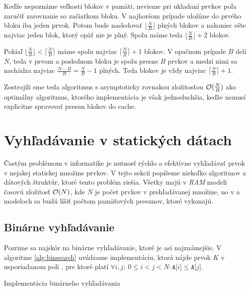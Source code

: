 Keďže nepoznáme veľkosti blokov v pamäti, nevieme pri ukladaní prvkov poľa zaručiť zarovnanie so začiatkom bloku. V najhoršom prípade uložíme do prvého bloku iba jeden prvok. Potom bude nasledovať $\lfloor \frac{N}{B} \rfloor$ plných blokov a nakoniec ešte najviac jeden blok, ktorý opäť nie je plný. Spolu máme teda $\lfloor \frac{N}{B} \rfloor + 2$ blokov.

Pokiaľ $\lfloor \frac{N}{B} \rfloor < \lceil \frac{N}{B} \rceil$ máme spolu najviac $\lceil \frac{N}{B} \rceil + 1$ blokov. V opačnom prípade $B$ delí $N$, teda v prvom a poslednom bloku je spolu presne $B$ prvkov a medzi nimi sa nachádza najviac $\frac{N-B}{B} = \frac{N}{B} - 1$ plných. Teda blokov je vždy najviac $\lceil \frac{N}{B} \rceil +1$.

Zostrojili sme teda \obliv algoritmus s asymptoticky rovnakou zložitosťou $\mathcal{O}(\frac{N}{B})$ ako optimálny \aware algoritmus, ktorého implementácia je však jednoduchšia, keďže nemusí explicitne spravovať presun blokov do cache.

\section{Vyhľadávanie v statických dátach}
Častým problémom v informatike je nutnosť rýchlo a efektívne vyhľadávať prvok v nejakej statickej množine prvkov. V tejto sekcii popíšeme niekoľko algoritmov a dátových štruktúr, ktoré tento problém riešia. Všetky majú v \emph{RAM} modeli časovú zložitosť $\mathcal{O}(N)$, kde $N$ je počet prvkov v prehľadávanej množine, no v \aware a \obliv modeloch sa budú líšiť počtom pamäťových presunov, ktoré vykonajú.

\subsection{Binárne vyhľadávanie}
Pozrime sa najskôr na binárne vyhľadávanie, ktoré je asi najznámejšie. V algoritme \ref{alg:binsearch} uvádzame implementáciu, ktorá nájde prvok $K$ v usporiadanom poli , pre ktoré platí $\forall i,j;~ 0\le i < j < N: \texttt{A[}i\texttt{]} \le \texttt{A[}j\texttt{]}$.

\begin{algorithm}
    \caption{Implementácia binárneho vyhľadávania}
    \label{alg:binsearch}
    \begin{algorithmic}[1]
                    \State {}
                \Else
                \EndIf
            \EndWhile
            \State {} 
        \EndFunction
    \end{algorithmic}
\end{algorithm}

